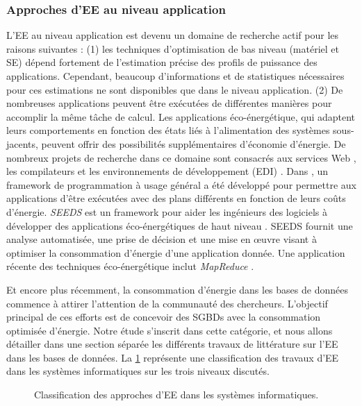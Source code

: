 \subsubsection{Approches d'EE au niveau application}
L'EE au niveau application est devenu un domaine de recherche actif pour les raisons suivantes : (1) les techniques d'optimisation de bas niveau (matériel et SE) dépend fortement de l'estimation précise des profils de puissance des applications. Cependant, beaucoup d'informations et de statistiques nécessaires pour ces estimations ne sont disponibles que dans le niveau application. (2) De nombreuses applications peuvent être exécutées de différentes manières pour accomplir la même tâche de calcul. Les applications éco-énergétique, qui adaptent leurs comportements en fonction des états liés à l'alimentation des systèmes sous-jacents, peuvent offrir des possibilités supplémentaires d'économie d'énergie. De nombreux projets de recherche dans ce domaine sont consacrés aux services Web \cite{Bohrer02,Sharma03,Chase01,Chen05}, les compilateurs \cite{Hsu03,Huang07,Kadayif05} et les environnements de développement (EDI) \cite{Capra12}. Dans \cite{Xian07}, un framework de programmation à usage général a été développé pour permettre aux applications d'être exécutées avec des plans différents en fonction de leurs coûts d'énergie. \textit{SEEDS} est un framework pour aider les ingénieurs des logiciels à développer des applications éco-énergétiques de haut niveau \cite{Manotas14}. SEEDS fournit une analyse automatisée, une prise de décision et une mise en œuvre visant à optimiser la consommation d'énergie d'une application donnée. Une application récente des techniques éco-énergétique inclut \textit{MapReduce} \cite{Chen12,Lang10,Leverich10}.

Et encore plus récemment, la consommation d'énergie dans les bases de données commence à attirer l'attention de la communauté des chercheurs. L'objectif principal de ces efforts est de concevoir des SGBDs avec la consommation optimisée d'énergie. Notre étude s'inscrit dans cette catégorie, et nous allons détailler dans une section séparée les différents travaux de littérature sur l'EE dans les bases de données. La \ref{fig:energy-approaches-classification} représente une classification des travaux d'EE dans les systèmes informatiques sur les trois niveaux discutés.

\begin{figure}
\footnotesize
\begin{center}

\caption{Classification des approches d’EE dans les systèmes informatiques.}
\label{fig:energy-approaches-classification}
\end{center}
\end{figure}


